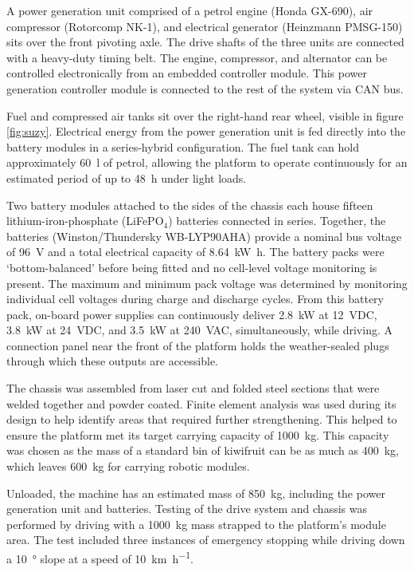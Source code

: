 \documentclass[preprint,authoryear,12pt]{elsarticle}
\begin{document}
        A power generation unit comprised of a petrol engine (Honda GX-690), air compressor (Rotorcomp NK-1), and electrical generator (Heinzmann PMSG-150) sits over the front pivoting axle.
        The drive shafts of the three units are connected with a heavy-duty timing belt.
        The engine, compressor, and alternator can be controlled electronically from an embedded controller module.
        This power generation controller module is connected to the rest of the system via CAN bus.

        Fuel and compressed air tanks sit over the right-hand rear wheel, visible in figure \ref{fig:suzy}.
        Electrical energy from the power generation unit is fed directly into the battery modules in a series-hybrid configuration.
        The fuel tank can hold approximately \SI{60}{\litre} of petrol, allowing the platform to operate continuously for an estimated period of up to \SI{48}{\hour} under light loads.

        Two battery modules attached to the sides of the chassis each house fifteen lithium-iron-phosphate (LiFePO$_{\text{4}}$) batteries connected in series.
        Together, the batteries (Winston/Thundersky WB-LYP90AHA) provide a nominal bus voltage of \SI{96}{\volt} and a total electrical capacity of \SI{8.64}{\kilo\watt\hour}.
        The battery packs were `bottom-balanced' before being fitted and no cell-level voltage monitoring is present.
        The maximum and minimum pack voltage was determined by monitoring individual cell voltages during charge and discharge cycles.
        From this battery pack, on-board power supplies can continuously deliver \SI{2.8}{\kilo\watt} at \SI{12}{\volt}DC, \SI{3.8}{\kilo\watt} at \SI{24}{\volt}DC, and \SI{3.5}{\kilo\watt} at \SI{240}{\volt}AC, simultaneously, while driving.
        A connection panel near the front of the platform holds the weather-sealed plugs through which these outputs are accessible.

        The chassis was assembled from laser cut and folded steel sections that were welded together and powder coated.
        Finite element analysis was used during its design to help identify areas that required further strengthening.
        This helped to ensure the platform met its target carrying capacity of \SI{1000}{\kilo\gram}.
        This capacity was chosen as the mass of a standard bin of kiwifruit can be as much as \SI{400}{\kilo\gram}, which leaves \SI{600}{\kilo\gram} for carrying robotic modules.

        Unloaded, the machine has an estimated mass of \SI{850}{\kilo\gram}, including the power generation unit and batteries.
        Testing of the drive system and chassis was performed by driving with a \SI{1000}{\kilo\gram} mass strapped to the platform's module area.
        The test included three instances of emergency stopping while driving down a \SI{10}{\degree} slope at a speed of \SI{10}{\kilo\meter\per\hour}.
\end{document}
